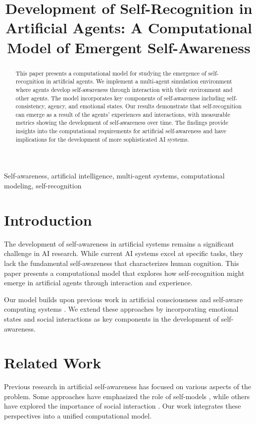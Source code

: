 \documentclass[conference]{IEEEtran}
\title{Development of Self-Recognition in Artificial Agents: A Computational Model of Emergent Self-Awareness}
\author{
    \IEEEauthorblockN{Your Name}
    \IEEEauthorblockA{
        Department of Computer Science\\
        Your University\\
        City, Country\\
        email@example.com
    }
}
\begin{document}
\maketitle

\begin{abstract}
This paper presents a computational model for studying the emergence of self-recognition in artificial agents. We implement a multi-agent simulation environment where agents develop self-awareness through interaction with their environment and other agents. The model incorporates key components of self-awareness including self-consistency, agency, and emotional states. Our results demonstrate that self-recognition can emerge as a result of the agents' experiences and interactions, with measurable metrics showing the development of self-awareness over time. The findings provide insights into the computational requirements for artificial self-awareness and have implications for the development of more sophisticated AI systems.
\end{abstract}

\begin{IEEEkeywords}
Self-awareness, artificial intelligence, multi-agent systems, computational modeling, self-recognition
\end{IEEEkeywords}

\section{Introduction}
The development of self-awareness in artificial systems remains a significant challenge in AI research. While current AI systems excel at specific tasks, they lack the fundamental self-awareness that characterizes human cognition. This paper presents a computational model that explores how self-recognition might emerge in artificial agents through interaction and experience.

Our model builds upon previous work in artificial consciousness \cite{cite1} and self-aware computing systems \cite{cite2}. We extend these approaches by incorporating emotional states and social interactions as key components in the development of self-awareness.

\section{Related Work}
Previous research in artificial self-awareness has focused on various aspects of the problem. Some approaches have emphasized the role of self-models \cite{cite3}, while others have explored the importance of social interaction \cite{cite4}. Our work integrates these perspectives into a unified computational model.
\end{document}
